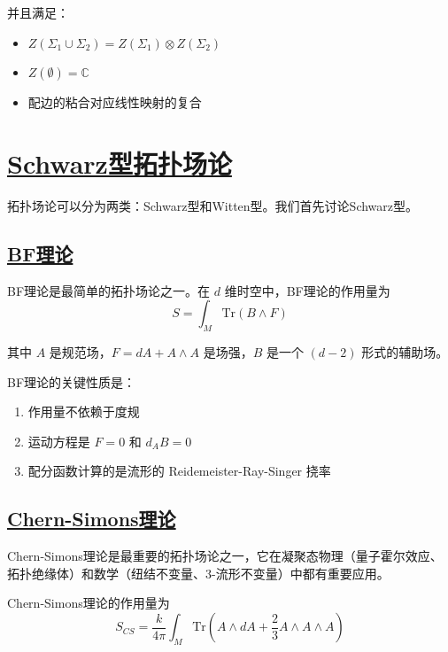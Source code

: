 并且满足：
\begin{itemize}
    \item $Z(\Sigma_1 \cup \Sigma_2) = Z(\Sigma_1) \otimes Z(\Sigma_2)$
    \item $Z(\emptyset) = \mathbb{C}$
    \item 配边的粘合对应线性映射的复合
\end{itemize}

\section{\protect\hyperlink{:}{Schwarz型拓扑场论}}

拓扑场论可以分为两类：Schwarz型和Witten型。我们首先讨论Schwarz型。

\subsection{\protect\hyperlink{:}{BF理论}}

BF理论是最简单的拓扑场论之一。在 $d$ 维时空中，BF理论的作用量为
\begin{equation}
    S = \int_M \text{Tr}(B \wedge F)
\end{equation}

其中 $A$ 是规范场，$F = dA + A \wedge A$ 是场强，$B$ 是一个 $(d-2)$ 形式的辅助场。

BF理论的关键性质是：
\begin{enumerate}
    \item 作用量不依赖于度规
    \item 运动方程是 $F = 0$ 和 $d_A B = 0$
    \item 配分函数计算的是流形的 Reidemeister-Ray-Singer 挠率
\end{enumerate}

\subsection{\protect\hyperlink{:}{Chern-Simons理论}}

Chern-Simons理论是最重要的拓扑场论之一，它在凝聚态物理（量子霍尔效应、拓扑绝缘体）和数学（纽结不变量、3-流形不变量）中都有重要应用。

Chern-Simons理论的作用量为
\begin{equation}
    S_{CS} = \frac{k}{4\pi} \int_M \text{Tr}\left(A \wedge dA + \frac{2}{3}A \wedge A \wedge A\right)
\end{equation}

